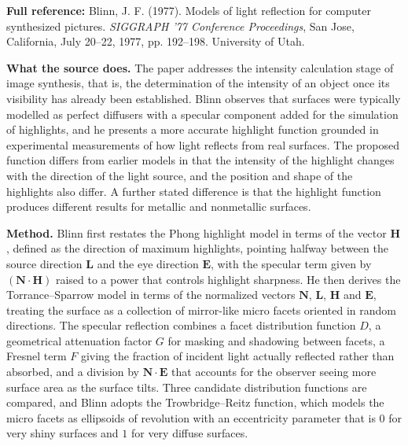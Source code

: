 \documentclass[11pt, a4paper]{article}
\begin{document}
\begin{refbox}
\textbf{Full reference:} Blinn, J. F. (1977). Models of light reflection for computer synthesized pictures. \emph{SIGGRAPH '77 Conference Proceedings}, San Jose, California, July 20--22, 1977, pp. 192--198. University of Utah.
\end{refbox}

\textbf{What the source does.} The paper addresses the intensity calculation stage of image synthesis, that is, the determination of the intensity of an object once its visibility has already been established. Blinn observes that surfaces were typically modelled as perfect diffusers with a specular component added for the simulation of highlights, and he presents a more accurate highlight function grounded in experimental measurements of how light reflects from real surfaces. The proposed function differs from earlier models in that the intensity of the highlight changes with the direction of the light source, and the position and shape of the highlights also differ. A further stated difference is that the highlight function produces different results for metallic and nonmetallic surfaces.

\textbf{Method.} Blinn first restates the Phong highlight model in terms of the vector $\mathbf{H}$, defined as the direction of maximum highlights, pointing halfway between the source direction $\mathbf{L}$ and the eye direction $\mathbf{E}$, with the specular term given by $(\mathbf{N}\cdot\mathbf{H})$ raised to a power that controls highlight sharpness. He then derives the Torrance--Sparrow model in terms of the normalized vectors $\mathbf{N}$, $\mathbf{L}$, $\mathbf{H}$ and $\mathbf{E}$, treating the surface as a collection of mirror-like micro facets oriented in random directions. The specular reflection combines a facet distribution function $D$, a geometrical attenuation factor $G$ for masking and shadowing between facets, a Fresnel term $F$ giving the fraction of incident light actually reflected rather than absorbed, and a division by $\mathbf{N}\cdot\mathbf{E}$ that accounts for the observer seeing more surface area as the surface tilts. Three candidate distribution functions are compared, and Blinn adopts the Trowbridge--Reitz function, which models the micro facets as ellipsoids of revolution with an eccentricity parameter that is $0$ for very shiny surfaces and $1$ for very diffuse surfaces.
\end{document}
